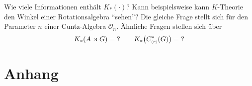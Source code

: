 \begin{frageA}
	Wie viele Informationen enthält $K_*(\cdot)$?
	Kann beispielsweise kann $K$-Theorie den Winkel einer Rotationsalgebra \enquote{sehen}?
	Die gleiche Frage stellt sich für den Parameter $n$ einer Cuntz-Algebra $\mathcal{O}_n$.
	Ähnliche Fragen stellen sich über 
	\[
		K_* \enbrace*{A \rtimes  G} = \text{?} \qquad K_* \enbrace*{C^*_\ssbrace{r}(G)} = \text{?}
	\]
\end{frageA}


\cleardoubleoddemptypage
{}
\setcounter{page}{1}
\cleardoubleoddemptypage
\appendix

\section{Anhang} %
\label{sec:anhang}

\printindex
\printbibliography
\listoffigures
\todototoc
{}

